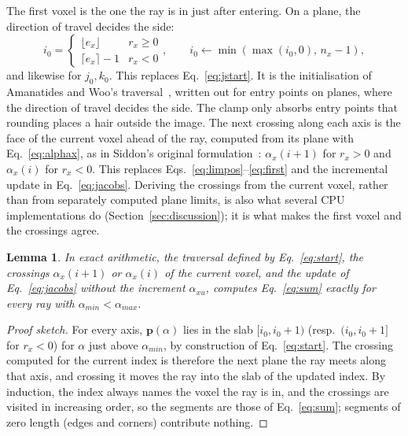 \documentclass[11pt,a4paper]{article}
\newtheorem{lemma}{Lemma}
\theoremstyle{remark}
\begin{document}
The first voxel is the one the ray is in just after entering. On a plane, the direction of travel
decides the side:
\begin{equation}
i_0=\begin{cases}\lfloor e_x\rfloor & r_x\ge0\\ \lceil e_x\rceil-1 & r_x<0\end{cases},\qquad
i_0\gets\min(\max(i_0,0),\,n_x-1), \label{eq:start}
\end{equation}
and likewise for $j_0,k_0$. This replaces Eq.~\eqref{eq:jstart}. It is the initialisation of Amanatides and
Woo's traversal~\cite{amanatides1987fast}, written out for entry points on planes, where the direction of
travel decides the side. The clamp only absorbs entry points that rounding places a hair outside the image.
The next crossing along each axis is the face of the current voxel ahead of the ray, computed from its plane
with Eq.~\eqref{eq:alphax}, as in Siddon's original formulation~\cite{siddon1985fast}: $\alpha_x(i+1)$ for
$r_x>0$ and $\alpha_x(i)$ for $r_x<0$. This replaces Eqs.~\eqref{eq:limpos}--\eqref{eq:first} and the
incremental update in Eq.~\eqref{eq:jacobs}. Deriving the crossings from the current voxel, rather than from
separately computed plane limits, is also what several CPU implementations do
(Section~\ref{sec:discussion}); it is what makes the first voxel and the crossings agree.

\begin{lemma}\label{lem:consistent}
In exact arithmetic, the traversal defined by Eq.~\eqref{eq:start}, the crossings $\alpha_x(i+1)$ or
$\alpha_x(i)$ of the current voxel, and the update of Eq.~\eqref{eq:jacobs} without the increment
$\alpha_{xu}$, computes Eq.~\eqref{eq:sum} exactly for every ray with $\alpha_{min}<\alpha_{max}$.
\end{lemma}

\begin{proof}[Proof sketch]
For every axis, $\mathbf{p}(\alpha)$ lies in the slab $[i_0,i_0+1)$ (resp.\ $(i_0,i_0+1]$ for $r_x<0$) for
$\alpha$ just above $\alpha_{min}$, by construction of Eq.~\eqref{eq:start}. The crossing computed for
the current index is therefore the next plane the ray meets along that axis, and crossing it moves the
ray into the slab of the updated index. By induction, the index always names the voxel the ray is in,
and the crossings are visited in increasing order, so the segments are those of Eq.~\eqref{eq:sum};
segments of zero length (edges and corners) contribute nothing.
\end{proof}
\end{document}
